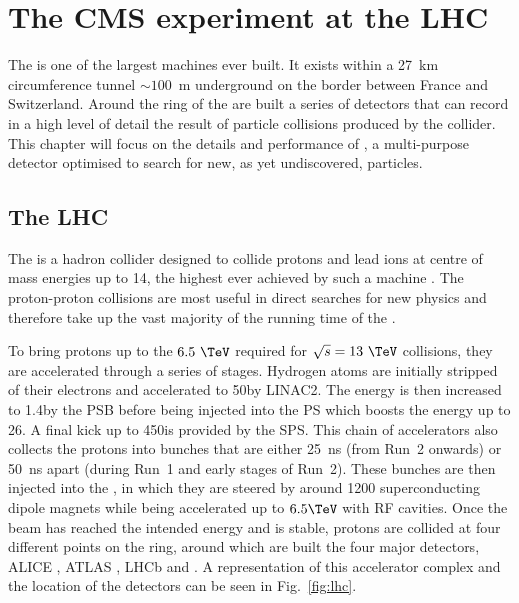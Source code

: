 \chapter{The CMS experiment at the LHC}
\label{chap:detector}


The \LHC is one of the largest machines ever built. It exists within a
27~km circumference tunnel $\sim 100$~m underground on the border between France and
Switzerland. Around the ring of the \LHC are built a series of
detectors that can record in a high level of detail the result of
particle collisions produced by the collider. This chapter will focus
on the details and performance of \CMS, a multi-purpose detector
optimised to search for new, as yet undiscovered, particles.

\section{The LHC}
\label{sec:lhc}

The \LHC is a hadron collider designed to collide protons and lead
ions at centre of mass energies up to 14\tev, the highest ever achieved by such a
machine
\cite{Evans:2008zzb,CERN-2004-003-V-1,CERN-2004-003-V-2,CERN-2004-003-V-3}.
The proton-proton collisions are most useful in direct searches for
new physics and therefore take up the vast majority of the
running time of the \LHC. 

To bring protons up to the $6.5~\tev$ required for $\sqrt{s}=13~\tev$
collisions,
they are accelerated through a series of stages. Hydrogen atoms are
initially stripped of their electrons and accelerated to 50\mev by
\ac{LINAC2}. The energy is then increased to 1.4\gev by the \ac{PSB}
before being injected into the \ac{PS} which boosts the energy up to
26\gev. A final kick up to 450\gev is provided by the \ac{SPS}. This
chain of accelerators also collects the protons into bunches that are
either 25~ns (from Run~2 onwards) or 50~ns apart (during Run~1 and
early stages of Run~2). These bunches are then injected into the \LHC,
in which they are steered by around 1200 superconducting dipole
magnets while being accelerated up to $6.5\tev$ with \ac{RF} cavities.
Once the beam has reached the intended energy and is stable, protons
are collided at four different points on the ring, around which are
built the four major \LHC detectors, ALICE \cite{Aamodt:2008zz}, ATLAS
\cite{Aad:2008zzm}, LHCb \cite{Alves:2008zz} and \CMS
\cite{Chatrchyan:2008aa}.  A representation of this accelerator
complex and the location of the detectors can be seen in
Fig.~\ref{fig:lhc}.

